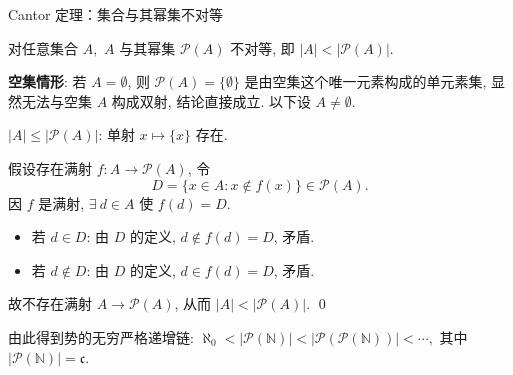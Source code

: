 \begin{frame}{Cantor 定理：集合与其幂集不对等}

\begin{thm}[Cantor 定理]
对任意集合 $A,$ $A$ 与其幂集 $\mathscr{P}(A)$ 不对等, 即 $|A| < |\mathscr{P}(A)|$.
\end{thm}

\pause

\startproof[bg=yellow, fg=red]

{\color{red}} \textbf{空集情形}: 若 $A = \emptyset$, 则 $\mathscr{P}(A) = \{\emptyset\}$ 是由空集这个唯一元素构成的单元素集, 显然无法与空集 $A$ 构成双射, 结论直接成立. 以下设 $A \neq \emptyset$.

\pause

{\color{red}} $|A| \leqslant |\mathscr{P}(A)|$: 单射 $x \mapsto \{x\}$ 存在.

\pause

{\color{red}} 假设存在\alert{满射} $f: A \to \mathscr{P}(A)$, 令
\[
D = \{ x \in A : x \notin f(x) \} \in \mathscr{P}(A).
\]
因 $f$ 是满射, $\exists~d \in A$ 使 $f(d) = D$.

\pause

\begin{itemize}
\item 若 $d \in D$: 由 $D$ 的定义, $d \notin f(d) = D$, 矛盾.
\item 若 $d \notin D$: 由 $D$ 的定义, $d \in f(d) = D$, 矛盾.
\end{itemize}

故不存在满射 $A \to \mathscr{P}(A)$, 从而 $|A| < |\mathscr{P}(A)|$.
\qed

\pause

\begin{remark}
由此得到势的无穷严格递增链: $\aleph_0 < |\mathscr{P}(\mathbb{N})| < |\mathscr{P}(\mathscr{P}(\mathbb{N}))| < \cdots,$ 其中 $|\mathscr{P}(\mathbb{N})| = \mathfrak{c}$.
\end{remark}

\end{frame}




